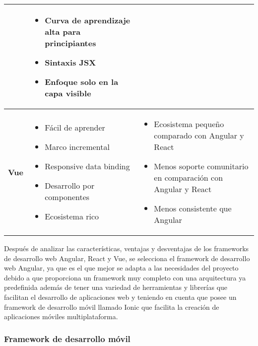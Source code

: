 \begin{footnotesize}
\begin{spacing}{1}
\begin{center}
\begin{longtable}[c]{ |>{\bfseries}p{} |p{} |p{}|    }
\begin{itemize}
            \end{itemize}
            & \begin{itemize}
                  \item Curva de aprendizaje alta para principiantes
                  \item Sintaxis JSX
                  \item Enfoque solo en la capa visible
            \end{itemize} \\
            \hline
            Vue & \begin{itemize}
                      \item Fácil de aprender
                      \item Marco incremental
                      \item Responsive data binding
                      \item Desarrollo por componentes
                      \item Ecosistema rico
            \end{itemize}
            & \begin{itemize}
                  \item Ecosistema pequeño comparado con Angular y React
                  \item Menos soporte comunitario en comparación con Angular y React
                  \item Menos consistente que Angular
            \end{itemize} \\
            \hline
        \end{longtable}
    \end{center}
\end{spacing}
\end{footnotesize}
Después de analizar las características, ventajas y desventajas de los frameworks de desarrollo web Angular, React y Vue, se selecciona el framework de desarrollo web Angular, ya que es el que mejor se adapta a las necesidades del proyecto debido a que proporciona un framework muy completo con una arquitectura ya predefinida además de tener una variedad de herramientas y librerías que facilitan el desarrollo de aplicaciones web y teniendo en cuenta que posee un framework de desarrollo móvil llamado Ionic que facilita la creación de aplicaciones móviles multiplataforma.

\subsubsection{Framework de desarrollo móvil}\label{subsubsec:framework-desarrollo-movil}

